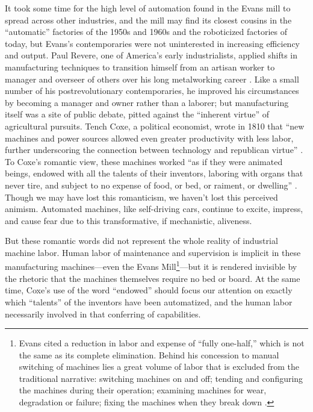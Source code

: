 It took some time for the high level of automation found in the Evans
mill to spread across other industries, and the mill may find its
closest cousins in the ``automatic'' factories of the 1950s and 1960s
and the roboticized factories of today, but Evans's contemporaries
were not uninterested in increasing efficiency and output. Paul
Revere, one of America's early industrialists, applied shifts in
manufacturing techniques to transition himself from an
artisan worker to manager and overseer of others over his long
metalworking career \cite[p. 187]{martello}. Like a small number of
his postrevolutionary 
contemporaries, he improved his circumstances by becoming a manager
and owner rather than a laborer; but manufacturing itself was a site of public
debate, pitted against the ``inherent virtue'' of agricultural pursuits.
Tench Coxe, a political economist, wrote in 1810 that ``new machines
and power sources allowed even greater productivity with less labor,
further underscoring the connection between technology and republican
virtue'' \cite[p. 217]{martello}. To Coxe's romantic view, these machines  worked ``as if they
were animated beings, endowed with all the talents of their inventors,
laboring with organs that never tire, and subject to no expense of
food, or bed, or raiment, or dwelling'' \cite[p. xxv]{coxe}. Though we
may have lost this romanticism, we haven't lost this perceived
animism. Automated machines, like self-driving cars, continue to
excite, impress, and cause fear due to this transformative, if
mechanistic, aliveness.

But these romantic words did not represent the whole reality of
industrial machine labor. Human labor of
maintenance and supervision is implicit in these manufacturing
machines---even the Evans Mill\footnote{Evans cited a reduction in
  labor and expense of ``fully one-half,'' which is not the same as
  its complete elimination. Behind his concession to manual switching
  of machines lies a great volume of labor that is excluded
  from the traditional narrative: switching machines on and off;
  tending and configuring the machines during their operation; examining machines for
  wear, degradation or failure; fixing the machines when they break
  down \cite{evansMillguide}.}---but it is rendered invisible by the
rhetoric that the 
machines themselves require no bed or board. At the same time, Coxe's
use of the word ``endowed'' should focus our attention on exactly which
``talents'' of the inventors have been automatized, and the human
labor necessarily involved in that conferring of capabilities. 


